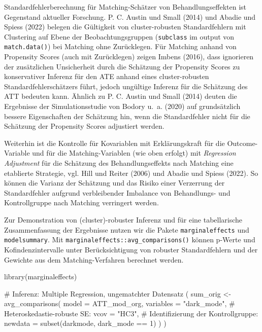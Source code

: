 \documentclass[
  a4paper,
  DIV=11,
  oneside]{scrreprt}
\newenvironment{Shaded}{\begin{snugshade}}{\end{snugshade}}
\newcommand{\AttributeTok}[1]{\textcolor[rgb]{0.40,0.45,0.13}{#1}}
\newcommand{\CommentTok}[1]{\textcolor[rgb]{0.37,0.37,0.37}{#1}}
\newcommand{\DecValTok}[1]{\textcolor[rgb]{0.68,0.00,0.00}{#1}}
\newcommand{\FunctionTok}[1]{\textcolor[rgb]{0.28,0.35,0.67}{#1}}
\newcommand{\NormalTok}[1]{\textcolor[rgb]{0.00,0.23,0.31}{#1}}
\newcommand{\OtherTok}[1]{\textcolor[rgb]{0.00,0.23,0.31}{#1}}
\newcommand{\SpecialCharTok}[1]{\textcolor[rgb]{0.37,0.37,0.37}{#1}}
\newcommand{\StringTok}[1]{\textcolor[rgb]{0.13,0.47,0.30}{#1}}
\begin{document}
Standardfehlerberechnung für Matching-Schätzer von Behandlungseffekten
ist Gegenstand aktueller Forschung. P. C. Austin und Small (2014) und
Abadie und Spiess (2022) belegen die Gültigkeit von cluster-robusten
Standardfehlern mit Clustering auf Ebene der Beobachtungsgruppen
(\texttt{subclass} im output von \texttt{match.data()}) bei Matching
ohne Zurücklegen. Für Matching anhand von Propensity Scores (auch mit
Zurücklegen) zeigen Imbens (2016), dass ignorieren der zusätzlichen
Unsicherheit durch die Schätzung der Propensity Scores zu konservativer
Inferenz für den ATE anhand eines cluster-robusten
Standardfehlerschätzers führt, jedoch ungültige Inferenz für die
Schätzung des ATT bedeuten kann. Ähnlich zu P. C. Austin und Small
(2014) deuten die Ergebnisse der Simulationsstudie von Bodory u.~a.
(2020) auf grundsätzlich bessere Eigenschaften der Schätzung hin, wenn
die Standardfehler nicht für die Schätzung der Propensity Scores
adjustiert werden.

Weiterhin ist die Kontrolle für Kovariablen mit Erklärungskraft für die
Outcome-Variable und für die Matching-Variablen (wie oben erfolgt) mit
\emph{Regression Adjustment} für die Schätzung des Behandlungseffekts
nach Matching eine etablierte Strategie, vgl. Hill und Reiter (2006) und
Abadie und Spiess (2022). So können die Varianz der Schätzung und das
Risiko einer Verzerrung der Standardfehler aufgrund verbleibender
Imbalance von Behandlungs- und Kontrollgruppe nach Matching verringert
werden.

Zur Demonstration von (cluster)-robuster Inferenz und für eine
tabellarische Zusammenfassung der Ergebnisse nutzen wir die Pakete
\texttt{marginaleffects} und \texttt{modelsummary}. Mit
\texttt{marginaleffects::avg\_comparisons()} können p-Werte und
Kofindenzintervalle unter Berücksichtigung von robuster Standardfehlern
und der Gewichte aus dem Matching-Verfahren berechnet werden.

\begin{Shaded}
\begin{Highlighting}[]
\FunctionTok{library}\NormalTok{(marginaleffects)}

\CommentTok{\# Inferenz: Multiple Regression, ungematchter Datensatz}
\NormalTok{(}
\NormalTok{  sum\_orig }\OtherTok{\textless{}{-}} \FunctionTok{avg\_comparisons}\NormalTok{(}
    \AttributeTok{model =}\NormalTok{ ATT\_mod\_org,}
    \AttributeTok{variables =} \StringTok{"dark\_mode"}\NormalTok{,}
    \CommentTok{\# Heteroskedastie{-}robuste SE:}
    \AttributeTok{vcov =} \StringTok{"HC3"}\NormalTok{, }
    \CommentTok{\# Identifizierung der Kontrollgruppe:}
    \AttributeTok{newdata =} \FunctionTok{subset}\NormalTok{(darkmode, dark\_mode }\SpecialCharTok{==} \DecValTok{1}\NormalTok{) }
\NormalTok{  )}
\NormalTok{) }
\end{Highlighting}
\end{Shaded}
\end{document}
